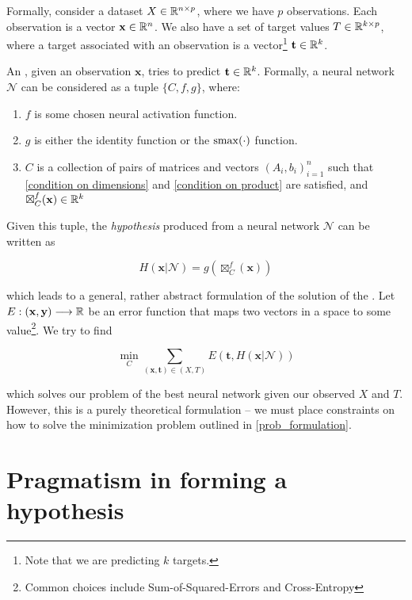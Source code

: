 Formally, consider a dataset $X\in\mathbb{R}^{n\times p}$, where we have $p$ observations. Each observation is a vector $\mathbf{x}\in\mathbb{R}^n$. We also have a set of target values $T\in\mathbb{R}^{k\times p}$, where a target associated with an observation is a vector\footnote{Note that we are predicting $k$ targets.} $\mathbf{t}\in\mathbb{R}^k$.

An \ann{}, given an observation $\mathbf{x}$, tries to predict $\mathbf{t}\in\mathbb{R}^k$. Formally, a neural network $\mathcal{N}$ can be considered as a tuple $\{ C, f, g \}$, where:
\label{nn_conditions}
\begin{enumerate}

\item $f$ is some chosen neural activation function.
\item $g$ is either the identity function or the $\mathrm{smax}(\cdot)$ function.
\item $C$ is a collection of pairs of matrices and vectors ${(A_i, b_i)}_{i=1}^{n}$ such that \eqref{condition on dimensions} and \eqref{condition on product} are satisfied, and $\boxtimes_{C}^{f}(\mathbf{x})\in\mathbb{R}^k$
\end{enumerate}

Given this tuple, the \emph{hypothesis} produced from a neural network $\mathcal{N}$ can be written as

\begin{equation}
\label{net_prediction}
H(\mathbf{x} | \mathcal{N}) = g(\boxtimes_{C}^{f}(\mathbf{x}))
\end{equation}

which leads to a general, rather abstract formulation of the solution of the \ann{}. Let $E : (\mathbf{x}, \mathbf{y}) \longrightarrow \mathbb{R}$ be an error function that maps two vectors in a space to some value\footnote{Common choices include Sum-of-Squared-Errors and Cross-Entropy}. We try to find

\begin{equation}
\label{prob_formulation}
\min_{C} \sum_{(\mathbf{x}, \mathbf{t}) \in (X, T)}E(\mathbf{t}, H(\mathbf{x} | \mathcal{N}))
\end{equation}

which solves our problem of the best neural network given our observed $X$ and $T$. However, this is a purely theoretical formulation -- we must place constraints on how to solve the minimization problem outlined in \eqref{prob_formulation}.


\section{Pragmatism in forming a hypothesis}

